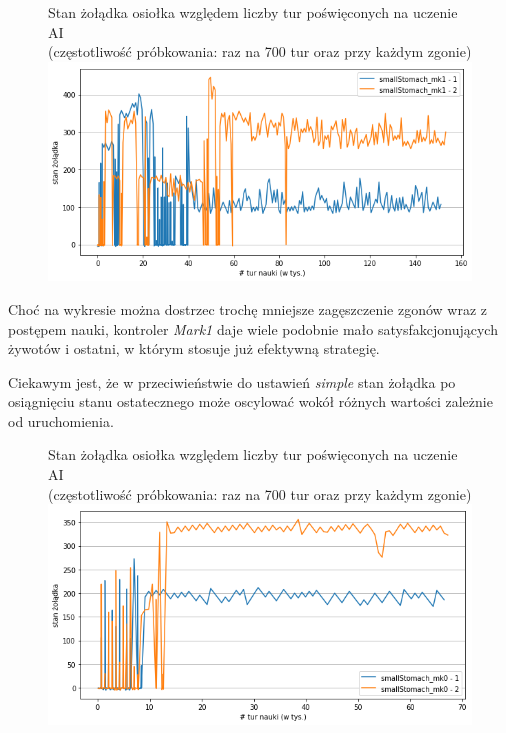 \begin{figure}[H]
    \centering
    
    Stan żołądka osiołka względem liczby tur poświęconych na uczenie AI
    \\(częstotliwość próbkowania: raz na 700 tur oraz przy każdym zgonie)
    \includegraphics[scale=0.6]{Chapters/smallStomach_mk1_hunger}
\end{figure}

Choć na wykresie można dostrzec trochę mniejsze zagęszczenie zgonów wraz z postępem nauki, kontroler \textit{Mark1} daje wiele podobnie mało satysfakcjonujących żywotów i ostatni, w którym stosuje już efektywną strategię.

Ciekawym jest, że w przeciwieństwie do ustawień \textit{simple} stan żołądka po osiągnięciu stanu ostatecznego może oscylować wokół różnych wartości zależnie od uruchomienia.

\begin{figure}[H]
    \centering
    Stan żołądka osiołka względem liczby tur poświęconych na uczenie AI
    \\(częstotliwość próbkowania: raz na 700 tur oraz przy każdym zgonie)
    \includegraphics[scale=0.6]{Chapters/smallStomach_mk0_hunger}
\end{figure}


